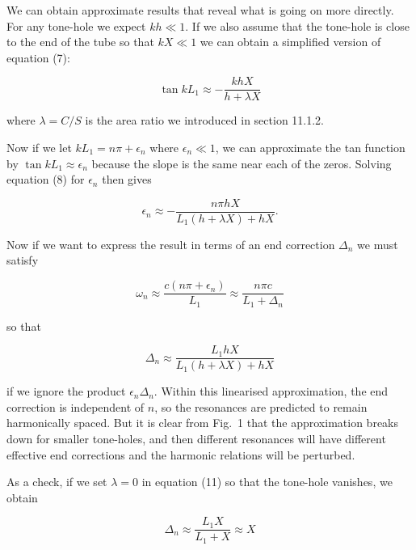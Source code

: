  We can obtain approximate results that reveal what is going on more directly. 
  For any tone-hole we expect $kh \ll 1$. If we also assume that the tone-hole 
  is close to the end of the tube so that $kX \ll 1$ we can obtain a simplified 
  version of equation (7): 

  \begin{equation*}\tan kL_1 \approx -\dfrac{khX}{h+ \lambda X} 
  \tag{8}\end{equation*} 

  \noindent{}where $\lambda = C/S$ is the area ratio we introduced in section 
  11.1.2. 

  Now if we let $kL_1=n\pi + \epsilon_n$ where $\epsilon_n \ll 1$, we can 
  approximate the tan function by $\tan kL_1 \approx \epsilon_n$ because the 
  slope is the same near each of the zeros. Solving equation (8) for 
  $\epsilon_n$ then gives 

  \begin{equation*}\epsilon_n \approx -\dfrac{n \pi h X}{L_1(h+\lambda X) +hX}. 
  \tag{9}\end{equation*} 

  Now if we want to express the result in terms of an end correction $\Delta_n$ 
  we must satisfy 

  \begin{equation*}\omega_n \approx \frac{c(n \pi +\epsilon_n)}{L_1} \approx 
  \dfrac{n \pi c}{L_1 + \Delta_n} \tag{10}\end{equation*} 

  \noindent{}so that 

  \begin{equation*}\Delta_n \approx \dfrac{L_1 h X}{L_1(h+ \lambda X) +hX} 
  \tag{11}\end{equation*} 

  \noindent{}if we ignore the product $\epsilon_n \Delta_n$. Within this 
  linearised approximation, the end correction is independent of $n$, so the 
  resonances are predicted to remain harmonically spaced. But it is clear from 
  Fig.\ 1 that the approximation breaks down for smaller tone-holes, and then 
  different resonances will have different effective end corrections and the 
  harmonic relations will be perturbed. 

  As a check, if we set $\lambda = 0$ in equation (11) so that the tone-hole 
  vanishes, we obtain 

  \begin{equation*}\Delta_n \approx \dfrac{L_1 X}{L_1 + X} \approx X 
  \tag{12}\end{equation*} 


